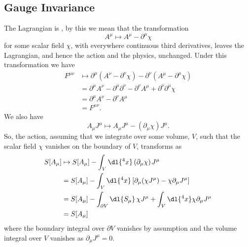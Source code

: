 \documentclass[fleqn]{NotesClass}
\begin{document}
    \subsection{Gauge Invariance}
    The Lagrangian is , by this we mean that the transformation
    \begin{equation}
        A^\mu \mapsto A^\mu - \partial^\mu \chi
    \end{equation}
    for some scalar field \(\chi\), with everywhere continuous third derivatives, leaves the Lagrangian, and hence the action and the physics, unchanged.
    Under this transformation we have
    \begin{align}
        F^{\mu\nu} &\mapsto \partial^\mu(A^\nu - \partial^\nu \chi) - \partial^\nu(A^\mu - \partial^\mu \chi)\\
        &= \partial^\mu A^\nu - \partial^\mu\partial^\nu - \partial^\nu A^\mu + \partial^\nu\partial^\mu \chi\\
        &= \partial^\mu A^\nu - \partial^\nu A^\mu\\
        &= F^{\mu\nu}.
    \end{align}
    We also have
    \begin{equation}
        A_\mu J^\mu \mapsto A_\mu J^\mu - (\partial_\mu\chi)J^\mu.
    \end{equation}
    So, the action, assuming that we integrate over some volume, \(V\), such that the scalar field \(\chi\) vanishes on the boundary of \(V\), transforms as
    \begin{align}
        S[A_\mu] &\mapsto S[A_\mu] - \int_V \dl{^4x} \, (\partial_\mu\chi) \mkern2mu J^\mu\\
        &= S[A_\mu] - \int_V \dl{^4x} \, [\partial_\mu(\chi J^\mu) - \chi\partial_\mu J^\mu]\\
        &= S[A_\mu] - \int_{\partial V} \dl{S_\mu} \, \chi J^\mu + \int_{V} \dl{^4x} \chi \partial_\mu J^\mu\\
        &= S[A_\mu]
    \end{align}
    where the boundary integral over \(\partial V\) vanishes by assumption and the volume integral over \(V\) vanishes as \(\partial_\mu J^\mu = 0\).
    
\end{document}
